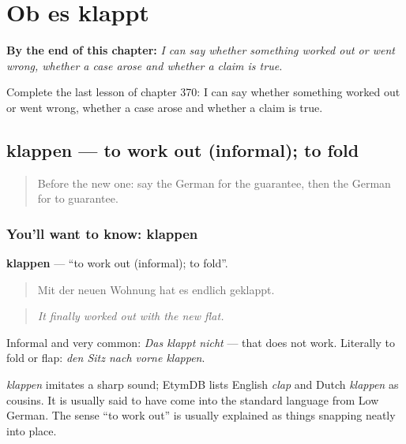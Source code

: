 
\chapter{Ob es klappt}
\label{ch:ge-ob-es-klappt}

\begin{chapteropening}
\textbf{By the end of this chapter:} \emph{I can say whether something worked out or went wrong, whether a case arose and whether a claim is true.}

Complete the last lesson of chapter 370: I can say whether something worked out or went wrong, whether a case arose and whether a claim is true.
\end{chapteropening}

\section[klappen]{klappen — to work out (informal); to fold}

\label{lesson:GE-C370-klappen}



\begin{quote}
Before the new one: say the German for the guarantee, then the German for to guarantee.
\end{quote}

\subsection*{You'll want to know: klappen}
\textbf{klappen} — \textquotedblleft{}to work out (informal); to fold\textquotedblright{}.

\begin{quote}
Mit der neuen Wohnung hat es endlich geklappt.
\end{quote}

\begin{quote}
\emph{It finally worked out with the new flat.}
\end{quote}

Informal and very common: \emph{Das klappt nicht} — that does not work. Literally to fold or flap: \emph{den Sitz nach vorne klappen}.

\begin{cousinweb}
\emph{klappen} imitates a sharp sound; EtymDB lists English \emph{clap} and Dutch \emph{klappen} as cousins. It is usually said to have come into the standard language from Low German. The sense \textquotedblleft{}to work out\textquotedblright{} is usually explained as things snapping neatly into place.
\end{cousinweb}

